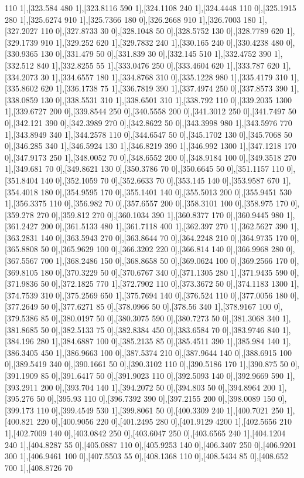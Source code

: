 {110 1],[323.584 480 1],[323.8116 590 1],[324.1108 240 1],[324.4448 110 0],[325.1915 280 1],[325.6274 910 1],[325.7366 180 0],[326.2668 910 1],[326.7003 180 1],[327.2027 110 0],[327.8733 30 0],[328.1048 50 0],[328.5752 130 0],[328.7789 620 1],[329.1739 910 1],[329.252 620 1],[329.7832 240 1],[330.165 240 0],[330.4238 480 0],[330.9365 130 0],[331.479 50 0],[331.839 30 0],[332.145 510 1],[332.4752 390 1],[332.512 840 1],[332.8255 55 1],[333.0476 250 0],[333.4604 620 1],[333.787 620 1],[334.2073 30 1],[334.6557 180 1],[334.8768 310 0],[335.1228 980 1],[335.4179 310 1],[335.8602 620 1],[336.1738 75 1],[336.7819 390 1],[337.4974 250 0],[337.8573 390 1],[338.0859 130 0],[338.5531 310 1],[338.6501 310 1],[338.792 110 0],[339.2035 1300 1],[339.6727 200 0],[339.8544 250 0],[340.5558 200 0],[341.3012 250 0],[341.7497 50 0],[342.121 390 0],[342.3989 270 0],[342.8622 50 0],[343.3998 980 1],[343.5976 770 1],[343.8949 340 1],[344.2578 110 0],[344.6547 50 0],[345.1702 130 0],[345.7068 50 0],[346.285 340 1],[346.5924 130 1],[346.8219 390 1],[346.992 1300 1],[347.1218 170 0],[347.9173 250 1],[348.0052 70 0],[348.6552 200 0],[348.9184 100 0],[349.3518 270 1],[349.681 70 0],[349.8621 130 0],[350.3786 70 0],[350.6645 50 0],[351.1157 110 0],[351.8404 140 0],[352.1059 70 0],[352.6633 70 0],[353.145 140 0],[353.9587 670 1],[354.4018 180 0],[354.9595 170 0],[355.1401 140 0],[355.5013 200 0],[355.9451 530 1],[356.3375 110 0],[356.982 70 0],[357.6557 200 0],[358.3101 100 0],[358.975 170 0],[359.278 270 0],[359.812 270 0],[360.1034 390 1],[360.8377 170 0],[360.9445 980 1],[361.2427 200 0],[361.5133 480 1],[361.7118 400 1],[362.397 270 1],[362.5627 390 1],[363.2831 140 0],[363.5943 270 0],[363.8644 70 0],[364.2248 210 0],[364.9735 170 0],[365.8808 50 0],[365.9629 100 0],[366.3202 220 0],[366.814 140 0],[366.9968 280 0],[367.5567 700 1],[368.2486 150 0],[368.8658 50 0],[369.0624 100 0],[369.2566 170 0],[369.8105 180 0],[370.3229 50 0],[370.6767 340 0],[371.1305 280 1],[371.9435 590 0],[371.9836 50 0],[372.1825 770 1],[372.7902 110 0],[373.3672 50 0],[374.1183 1300 1],[374.7539 310 0],[375.2569 650 1],[375.7694 140 0],[376.524 110 0],[377.0056 180 0],[377.2649 50 0],[377.6271 85 0],[378.0966 50 0],[378.56 340 1],[378.9167 100 0],[379.5386 85 0],[380.0197 50 0],[380.3075 590 0],[380.7273 50 0],[381.3068 340 1],[381.8685 50 0],[382.5133 75 0],[382.8384 450 0],[383.6584 70 0],[383.9746 840 1],[384.196 280 1],[384.6887 100 0],[385.2135 85 0],[385.4511 390 1],[385.984 140 1],[386.3405 450 1],[386.9663 100 0],[387.5374 210 0],[387.9644 140 0],[388.6915 100 0],[389.5419 340 0],[390.1661 50 0],[390.3102 110 0],[390.5186 170 1],[390.875 50 0],[391.1909 85 0],[391.6417 50 0],[391.9023 110 0],[392.5093 140 0],[392.9669 590 1],[393.2911 200 0],[393.704 140 1],[394.2072 50 0],[394.803 50 0],[394.8964 200 1],[395.276 50 0],[395.93 110 0],[396.7392 390 0],[397.2155 200 0],[398.0089 150 0],[399.173 110 0],[399.4549 530 1],[399.8061 50 0],[400.3309 240 1],[400.7021 250 1],[400.821 220 0],[400.9056 220 0],[401.2495 280 0],[401.9129 4200 1],[402.5656 210 1],[402.7009 140 0],[403.0842 250 0],[403.6047 250 0],[403.6565 240 1],[404.1204 240 1],[404.8287 55 0],[405.0887 110 0],[405.9253 140 0],[406.3407 250 0],[406.9201 300 1],[406.9461 100 0],[407.5503 55 0],[408.1368 110 0],[408.5434 85 0],[408.652 700 1],[408.8726 70 }
